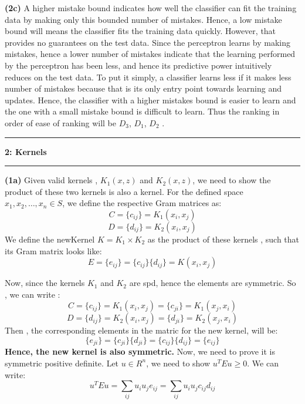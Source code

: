 \documentclass{article}
\newcommand\question[2]{\vspace{.25in}\hrule\textbf{#1: #2}\hrule\vspace{.10in}}
\renewcommand\part[1]{\vspace{.10in}\textbf{(#1)}}
\begin{document}
    \part{2c} A higher mistake bound indicates how well the classifier can fit the training data by making only this bounded number of mistakes. Hence, a low mistake bound will means the classifier fits the training data quickly. However, that provides no guarantees on the test data. Since the perceptron learns by making mistakes, hence a lower number of mistakes indicate that the learning performed by the perceptron has been less, and hence its predictive power intuitively reduces on the test data. To put it simply, a classifier learns less if it makes less number of mistakes because that is its only entry point towards learning and updates. Hence, the classifier with a higher mistakes bound is easier to learn and the one with a small mistake bound is difficult to learn. Thus the ranking in order of ease of ranking will be $D_3$, $D_1$, $D_2$ . \newline

    \question{2}{Kernels}
    \part{1a} Given valid kernels , $K_1(x,z)$ and $K_2(x,z)$, we need to show the product of these two kernels is also a kernel. For the defined space $x_1, x_2, \dots, x_n \in S$, we define the respective Gram matrices as: \newline
    \[ C = \{c_{ij}\} = K_1(x_i, x_j) \]
    \[ D = \{d_{ij}\} = K_2(x_i, x_j) \]
    We define the newKernel $K=K_1 \times K_2$ as the product of these kernels , such that its Gram matrix looks like: \newline
    \[ E = \{e_{ij}\} = \{c_{ij}\}\{d_{ij}\} = K(x_i, x_j) \]

    Now, since the kernels $K_1$ and $K_2$ are spd, hence the elements are symmetric. So , we can write : \newline
    \[ C = \{c_{ij}\} = K_1(x_i, x_j) = \{c_{ji}\} = K_1(x_j, x_i) \]
    \[ D = \{d_{ij}\} = K_2(x_i, x_j) = \{d_{ji}\} = K_2(x_j, x_i) \]
    Then , the corresponding elements in the matric for the new kernel, will be:
    \[ \{e_{ji}\} = \{c_{ji}\}\{d_{ji}\} = \{c_{ij}\}\{d_{ij}\} = \{e_{ij}\}  \]
    \textbf {Hence, the new kernel is also symmetric. }
    Now, we need to prove it is symmetric positive definite. Let $u \in R^n$, we need to show $u^TEu \geq 0$. We can write:\newline
    \begin{equation}
    u^TEu = \sum_{ij} u_i u_j e_{ij} = \sum_{ij} u_i u_j c_{ij} d_{ij}
    \end{equation}
\end{document}
